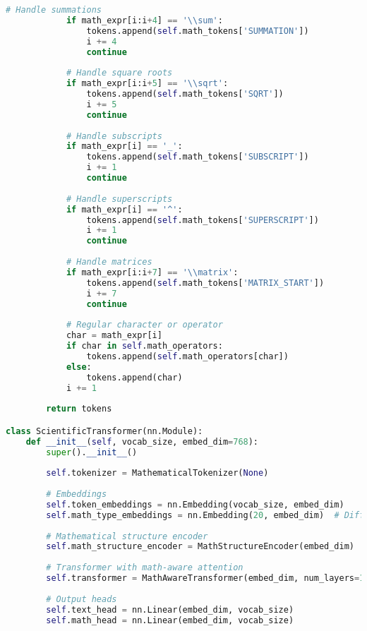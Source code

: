 \begin{lstlisting}[language=Python, caption=Mathematical formula tokenization system]
            # Handle summations
            if math_expr[i:i+4] == '\\sum':
                tokens.append(self.math_tokens['SUMMATION'])
                i += 4
                continue
            
            # Handle square roots
            if math_expr[i:i+5] == '\\sqrt':
                tokens.append(self.math_tokens['SQRT'])
                i += 5
                continue
            
            # Handle subscripts
            if math_expr[i] == '_':
                tokens.append(self.math_tokens['SUBSCRIPT'])
                i += 1
                continue
            
            # Handle superscripts
            if math_expr[i] == '^':
                tokens.append(self.math_tokens['SUPERSCRIPT'])
                i += 1
                continue
            
            # Handle matrices
            if math_expr[i:i+7] == '\\matrix':
                tokens.append(self.math_tokens['MATRIX_START'])
                i += 7
                continue
            
            # Regular character or operator
            char = math_expr[i]
            if char in self.math_operators:
                tokens.append(self.math_operators[char])
            else:
                tokens.append(char)
            i += 1
        
        return tokens

class ScientificTransformer(nn.Module):
    def __init__(self, vocab_size, embed_dim=768):
        super().__init__()
        
        self.tokenizer = MathematicalTokenizer(None)
        
        # Embeddings
        self.token_embeddings = nn.Embedding(vocab_size, embed_dim)
        self.math_type_embeddings = nn.Embedding(20, embed_dim)  # Different math contexts
        
        # Mathematical structure encoder
        self.math_structure_encoder = MathStructureEncoder(embed_dim)
        
        # Transformer with math-aware attention
        self.transformer = MathAwareTransformer(embed_dim, num_layers=12)
        
        # Output heads
        self.text_head = nn.Linear(embed_dim, vocab_size)
        self.math_head = nn.Linear(embed_dim, vocab_size)
        

\end{lstlisting}
